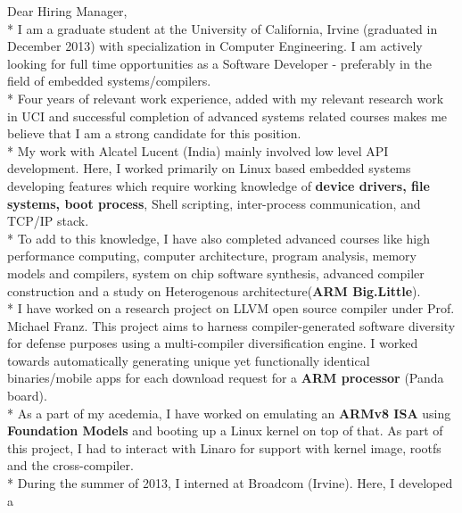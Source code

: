 \documentclass{cover}
\begin{document}
\thispagestyle{empty} %


Dear Hiring Manager,
\vspace{0.2in}
\\* 
I am a graduate student at the University of California, Irvine (graduated in
December 2013) with specialization in Computer Engineering. I am actively
looking
for full time opportunities as a Software Developer - preferably in the field
of
embedded systems/compilers. \vspace{0.2in}\\*
Four years of relevant work experience, added with my relevant research work in
UCI and successful completion of advanced systems related courses makes me
believe that I am a strong candidate for this position. \vspace{0.2in}\\*
My work with Alcatel Lucent (India) mainly involved low level API development. 
Here, I worked primarily on Linux based embedded systems developing features
which require working knowledge of {\bfseries device drivers, file systems,
boot process},
Shell scripting, inter-process communication, and TCP/IP stack. \vspace{0.2in}\\*
To add to this knowledge, I have also completed advanced courses like high
performance computing, computer architecture, program analysis, memory models and compilers,
system on chip software synthesis, advanced compiler construction and a study
on Heterogenous architecture({\bfseries ARM Big.Little}). \vspace{0.2in}\\*
I have worked on a research project on LLVM open source compiler
under Prof. Michael Franz. This project aims to harness compiler-generated
software diversity for defense purposes using a multi-compiler diversification
engine. I worked towards automatically generating unique yet functionally
identical
binaries/mobile apps for each download request for a {\bfseries ARM processor} (Panda board). \vspace{0.2in}\\*
As a part of my acedemia, I have worked on emulating an {\bfseries ARMv8 ISA} using
{\bfseries Foundation Models} and booting up a Linux kernel on top of that. As part of
this project, I had to interact with Linaro for support with kernel image, rootfs and
the cross-compiler. \vspace{0.2in}\\*
During the summer of 2013, I interned at Broadcom (Irvine). Here, I developed a
\end{document}
